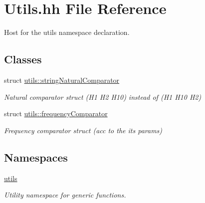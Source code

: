 \hypertarget{_utils_8hh}{}\section{Utils.\+hh File Reference}
\label{_utils_8hh}


Host for the utils namespace declaration.  


\subsection*{Classes}
\begin{DoxyCompactItemize}
\item 
struct \hyperlink{structutils_1_1string_natural_comparator}{utils\+::string\+Natural\+Comparator}
\begin{DoxyCompactList}\small\item\em Natural comparator struct (H1 H2 H10) instead of (H1 H10 H2) \end{DoxyCompactList}\item 
struct \hyperlink{structutils_1_1frequency_comparator}{utils\+::frequency\+Comparator}
\begin{DoxyCompactList}\small\item\em Frequency comparator struct (acc to the its params) \end{DoxyCompactList}\end{DoxyCompactItemize}
\subsection*{Namespaces}
\begin{DoxyCompactItemize}
\item 
 \hyperlink{namespaceutils}{utils}
\begin{DoxyCompactList}\small\item\em Utility namespace for generic functions. \end{DoxyCompactList}\end{DoxyCompactItemize}
